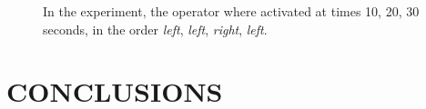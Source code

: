 \documentclass[letterpaper, 10 pt, conference]{ieeeconf}  %
\begin{document}
	\begin{figure}[h!]
		\begin{center}
		\end{center}
		\caption{In the experiment, the operator where activated at times 10, 20, 30 seconds, in the order \textit{left}, \textit{left}, \textit{right}, \textit{left}.}
		\label{fig:sim2-lr}
	\end{figure}

	\section{CONCLUSIONS}
	\label{sec:conclusions}
	
	
	\addtolength{\textheight}{-12cm}   %
	
	
\end{document}
